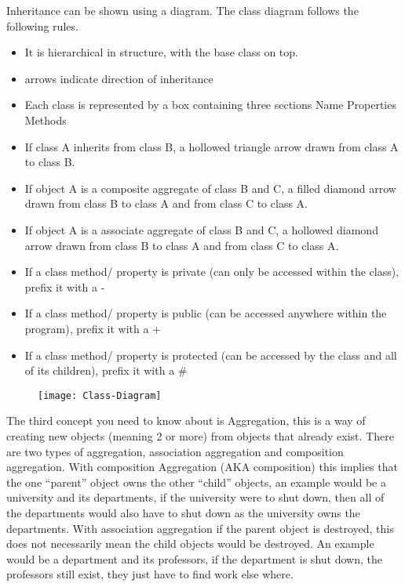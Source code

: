   	Inheritance can be shown using a diagram. The class diagram follows the following rules.
  	\begin{itemize}
  		\item It is hierarchical in structure, with the base class on top.
  		\item arrows indicate direction of inheritance
  		\item Each class is represented by a box containing three sections
	  		\subitem Name
	  		\subitem Properties
	  		\subitem Methods
  		\item If class A inherits from class B, a hollowed triangle arrow drawn from class A to class B.
  		\item If object A is a composite aggregate of class B and C, a filled diamond arrow drawn from class B to class A and from class C to class A.
  		\item If object A is a associate aggregate of class B and C, a hollowed diamond arrow drawn from class B to class A and from class C to class A.
  		\item If a class method/ property is private (can only be accessed within the class), prefix it with a -
  		\item If a class method/ property is public (can be accessed anywhere within the program), prefix it with a +
  		\item If a class method/ property is protected (can be accessed by the class and all of its children), prefix it with a \#
  	\end{itemize}
  	
  	\begin{figure}[H]
  		\centering
	  	\texttt{[image: Class-Diagram]}
    \end{figure}
  	The third concept you need to know about is Aggregation, this is a way of creating new objects (meaning 2 or more) from objects that already exist. There are two types of aggregation, association aggregation and composition aggregation. With composition Aggregation (AKA composition) this implies that the one ``parent'' object owns the other ``child'' objects, an example would be a university and its departments, if the university were to shut down, then all of the departments would also have to shut down as the university owns the departments. With association aggregation if the parent object is destroyed, this does not necessarily mean the child objects would be destroyed. An example would be a department and its professors, if the department is shut down, the professors still exist, they just have to find work else where.
  	
